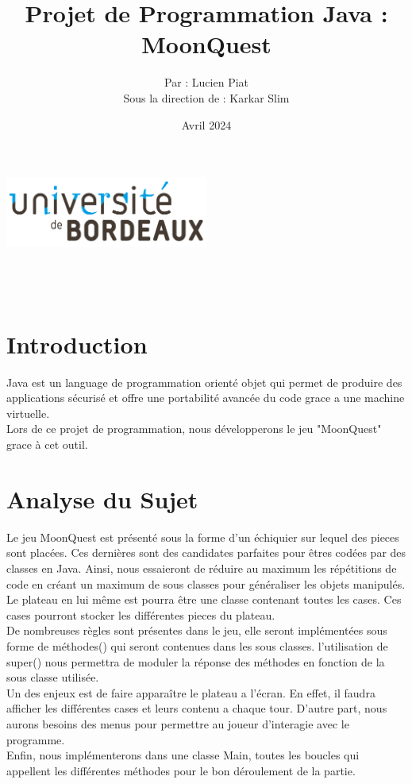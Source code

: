\documentclass[titlepage]{report}
\title{Projet de Programmation Java : MoonQuest}
\author{Par : Lucien Piat \\ \vspace{.5cm} Sous la direction de : Karkar Slim}
\date{Avril 2024}
\makeatletter
\def\maketitle{
\raggedright
\begin{center}
\includegraphics[width = 0.5\textwidth]{img/logo_ub.png}\\[15ex]
{\Huge \bfseries \@title }\\[10ex] 
{\huge  \@author}\\[10ex] 
{\Large \@date}\\
\end{center}}
\makeatother
\begin{document}
\maketitle
\thispagestyle{empty} 
\newpage
\tableofcontents
\thispagestyle{empty} 

\newpage
{}
\justify 
\section{Introduction}

Java est un language de programmation orienté objet qui permet de produire des applications sécurisé et 
offre une portabilité avancée du code grace a une machine virtuelle.\\

Lors de ce projet de programmation, nous développerons le jeu "MoonQuest" grace à cet outil.  

\section{Analyse du Sujet}

Le jeu MoonQuest est présenté sous la forme d'un échiquier sur lequel des pieces sont placées.
Ces dernières sont des candidates parfaites pour êtres codées par des classes en Java.
Ainsi, nous essaieront de réduire au maximum les répétitions de code en créant un maximum de sous classes pour généraliser les objets manipulés.\\

Le plateau en lui même est pourra être une classe contenant toutes les cases. Ces cases pourront stocker les différentes pieces du plateau.\\

De nombreuses règles sont présentes dans le jeu, elle seront implémentées sous forme de méthodes() qui seront contenues dans les sous classes.
l’utilisation de super() nous permettra de moduler la réponse des méthodes en fonction de la sous classe utilisée.\\

Un des enjeux est de faire apparaître le plateau a l'écran. En effet, il faudra afficher les différentes cases et leurs contenu a chaque tour.
D'autre part, nous aurons besoins des menus pour permettre au joueur d’interagie avec le programme.\\

Enfin, nous implémenterons dans une classe Main, toutes les boucles qui appellent les différentes méthodes pour le bon déroulement de la partie.\\
\end{document}
